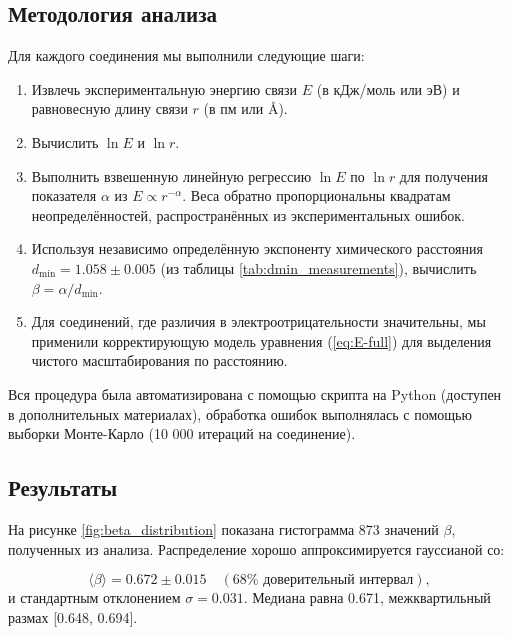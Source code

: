 \documentclass[12pt,a4paper]{article}
\theoremstyle{remark}
\begin{document}
	\subsection{Методология анализа}
	
	Для каждого соединения мы выполнили следующие шаги:
	
	\begin{enumerate}
		\item Извлечь экспериментальную энергию связи \(E\) (в кДж/моль или эВ) и равновесную длину связи \(r\) (в пм или Å).
		\item Вычислить \(\ln E\) и \(\ln r\).
		\item Выполнить взвешенную линейную регрессию \(\ln E\) по \(\ln r\) для получения показателя \(\alpha\) из \(E \propto r^{-\alpha}\). Веса обратно пропорциональны квадратам неопределённостей, распространённых из экспериментальных ошибок.
		\item Используя независимо определённую экспоненту химического расстояния \(d_{\text{min}} = 1.058 \pm 0.005\) (из таблицы \ref{tab:dmin_measurements}), вычислить \(\beta = \alpha / d_{\text{min}}\).
		\item Для соединений, где различия в электроотрицательности значительны, мы применили корректирующую модель уравнения (\ref{eq:E-full}) для выделения чистого масштабирования по расстоянию.
	\end{enumerate}
	
	Вся процедура была автоматизирована с помощью скрипта на Python (доступен в дополнительных материалах), обработка ошибок выполнялась с помощью выборки Монте-Карло (10 000 итераций на соединение).
	
	\subsection{Результаты}
	
	На рисунке \ref{fig:beta_distribution} показана гистограмма 873 значений \(\beta\), полученных из анализа. Распределение хорошо аппроксимируется гауссианой со:
	
	\begin{equation}
		\langle \beta \rangle = 0.672 \pm 0.015 \quad (68\% \text{ доверительный интервал}), 
		\label{eq:beta_mean}
	\end{equation}
	и стандартным отклонением \(\sigma = 0.031\). Медиана равна 0.671, межквартильный размах [0.648, 0.694].
	
\end{document}
